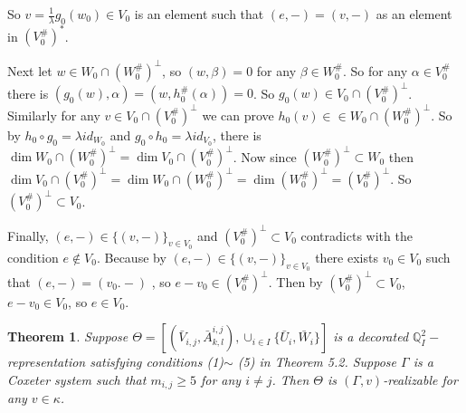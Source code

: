 \def\CTEXPreproc{Created by ctex v0.2.12, don't edit!}\documentclass[11pt]{article}
\newtheorem{thm}{Theorem}[section]
\begin{document}
\begin{pf}
 So $v=\frac{1}{\lambda} g_0 (w_0 ) \in V_0 $ is an element such that $(e,- )= (v,- )  $ as an element in  $( V^{\#}_0 )^* $.

 Next let $w\in W_0 \cap ( W^{\#}_0 )^{\perp}$, so  $(w,\beta  )=0$  for any $\beta \in W^{\#}_0 $. So for any $\alpha \in V^{\#}_0 $ there is $( g_0 (w) ,\alpha   )= (w, h^{\#}_0 (\alpha ))=0 $. So $g_0 (w) \in V_0 \cap ( V^{\#}_0 )^{\perp}$.   Similarly for any  $v \in V_0 \cap ( V^{\#}_0 )^{\perp}$ we can prove $h_0 (v) \in \in W_0 \cap ( W^{\#}_0 )^{\perp} $. So by $h_0 \circ g_0 = \lambda id_{W_0 }$ and
 $g_0 \circ h_0 = \lambda id_{V_0 }$,  there is $\dim  W_0 \cap ( W^{\#}_0 )^{\perp} = \dim  V_0 \cap ( V^{\#}_0 )^{\perp} $.  Now since
 $( W^{\#}_0   )^{\perp} \subset  W_0 $ then $\dim  V_0 \cap ( V^{\#}_0 )^{\perp}=\dim  W_0 \cap ( W^{\#}_0 )^{\perp} =\dim( W^{\#}_0 )^{\perp} = ( V^{\#}_0 )^{\perp} $. So $( V^{\#}_0  )^{\perp} \subset V_0  $.

   Finally, $(e,- )\in \{ (v,-) \}_{v\in V_0 }  $ and $( V^{\#}_0  )^{\perp} \subset V_0  $ contradicts with the condition $e\notin V_0 $. Because by $(e,- )\in \{ (v,-) \}_{v\in V_0 }  $ there exists $v_0 \in V_0$ such that $(e,- )=(v_0 .-)$ , so  $e-v_0 \in ( V^{\#}_0  )^{\perp} $. Then by $( V^{\#}_0  )^{\perp} \subset V_0  $, $e-v_0 \in V_0 $, so $e\in V_0 $.


\end{pf}


\begin{thm}
Suppose  $\Theta = [ ( \bar{V}_{i,j} , \bar{A}^{i,j}_{k,l} ) ,  \cup_{i\in I} \{ \bar{U}_i ,\bar{W}_i \}    ] $ is a decorated $\mathbb{Q}^2 _I -$representation satisfying conditions (1)$\sim$ (5) in Theorem 5.2. Suppose $\Gamma$ is a Coxeter system such that
$m_{i,j}\geq 5$ for any $i\neq j$. Then $\Theta$ is $(\Gamma ,v)$-realizable for any $v\in \kappa$.
\end{thm}
\end{document}
